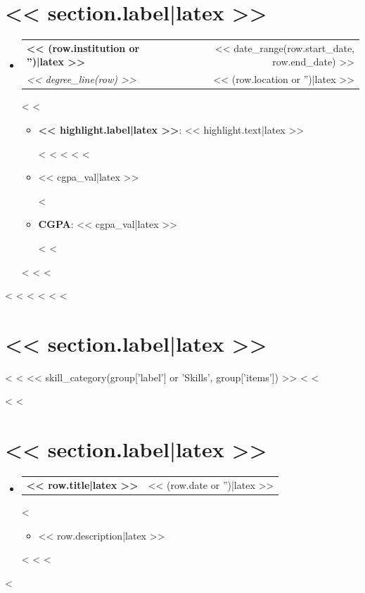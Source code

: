 \documentclass[letterpaper,11pt]{article}
\makeatletter
\newcommand{\resumeItem}[1]{
  \item\small{
    {#1 \vspace{-1pt}}
  }
}
\newcommand{\resumeSubheading}[4]{
  \vspace{-1pt}\item
    \begin{tabular*}{\textwidth}[t]{l@{\extracolsep{\fill}}r}
      \textbf{#1} & {\color{dark-grey}\small #2}\vspace{1pt}\\
      \textit{#3} & {\color{dark-grey} \small #4}\\
    \end{tabular*}\vspace{-4pt}
}
\newcommand{\resumeProjectHeading}[2]{
    \item
    \begin{tabular*}{\textwidth}{l@{\extracolsep{\fill}}r}
      #1 & {\color{dark-grey} \small #2} \\
    \end{tabular*}\vspace{-4pt}
}
\newcommand{\resumeSubHeadingListStart}{\begin{itemize}[leftmargin=0in, label={}]}
\newcommand{\resumeSubHeadingListEnd}{\end{itemize}}
\newcommand{\resumeItemListStart}{\begin{itemize}}
\newcommand{\resumeItemListEnd}{\end{itemize}\vspace{0pt}}
\makeatother
\begin{document}
\section{<< section.label|latex >>}
  \resumeSubHeadingListStart
<%
<%
    \resumeSubheading
      {<< (row.institution or '')|latex >>}{<< date_range(row.start_date, row.end_date) >>}
      {<< degree_line(row) >>}{<< (row.location or '')|latex >>}
<%
<%
      \resumeItemListStart
<%
<%
        \resumeItem{\textbf{<< highlight.label|latex >>}: << highlight.text|latex >>}
<%
<%
<%
<%
<%
        \resumeItem{<< cgpa_val|latex >>}
<%
        \resumeItem{\textbf{CGPA}: << cgpa_val|latex >>}
<%
<%
      \resumeItemListEnd
<%
<%
<%
  \resumeSubHeadingListEnd
<%
<%
<%
<%
<%
<%
\section{<< section.label|latex >>}
 \begin{itemize}[leftmargin=0in, label={}]
    \small{\item{
<%
<%
<< skill_category(group['label'] or 'Skills', group['items']) >>
<%
<%
    }}
 \end{itemize}
<%
<%
\section{<< section.label|latex >>}
  \resumeSubHeadingListStart
<%
<%
    \resumeProjectHeading
        {\textbf{<< row.title|latex >>}}{<< (row.date or '')|latex >>}
<%
        \resumeItemListStart
          \resumeItem{<< row.description|latex >>}
        \resumeItemListEnd
<%
<%
<%
  \resumeSubHeadingListEnd
<%
\end{document}
